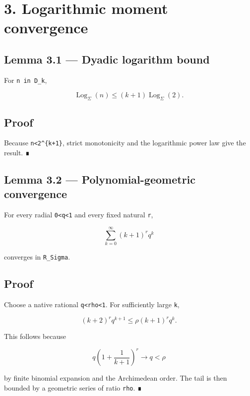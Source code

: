 \hypertarget{logarithmic-moment-convergence}{%
\section{3. Logarithmic moment convergence}\label{logarithmic-moment-convergence}}

\hypertarget{lemma-3.1-dyadic-logarithm-bound}{%
\subsection{Lemma 3.1 --- Dyadic logarithm bound}\label{lemma-3.1-dyadic-logarithm-bound}}

For \texttt{n\ in\ D\_k},

\[
\operatorname{Log}_\Sigma(n)
\le
(k+1)\operatorname{Log}_\Sigma(2).
\]

\hypertarget{proof-4}{%
\subsection{Proof}\label{proof-4}}

Because \texttt{n\textless{}2\^{}\{k+1\}}, strict monotonicity and the logarithmic power law give the
result. ∎

\hypertarget{lemma-3.2-polynomial-geometric-convergence}{%
\subsection{Lemma 3.2 --- Polynomial-geometric convergence}\label{lemma-3.2-polynomial-geometric-convergence}}

For every radial \texttt{0\textless{}q\textless{}1} and every fixed natural \texttt{r},

\[
\sum_{k=0}^{\infty}(k+1)^r q^k
\]

converges in \texttt{R\_Sigma}.

\hypertarget{proof-5}{%
\subsection{Proof}\label{proof-5}}

Choose a native rational \texttt{q\textless{}rho\textless{}1}. For sufficiently large \texttt{k},

\[
(k+2)^r q^{k+1}
\le
\rho (k+1)^r q^k.
\]

This follows because

\[
q\left(1+\frac1{k+1}\right)^r
\longrightarrow q<\rho
\]

by finite binomial expansion and the Archimedean order. The tail is then
bounded by a geometric series of ratio \texttt{rho}. ∎

